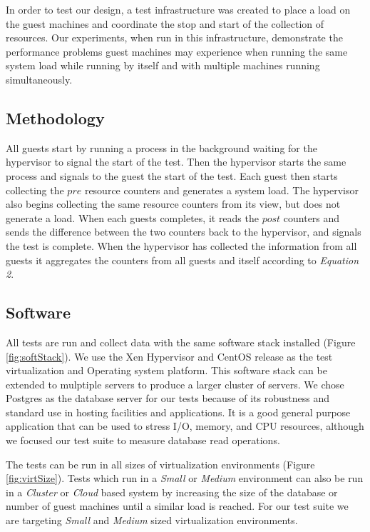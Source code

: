 In order to test our design, a test infrastructure was created to place a load on the guest machines and coordinate the stop and start of the collection of resources.   
Our experiments, when run in this infrastructure, demonstrate the performance problems guest machines may experience when running the same system load while running by itself and with multiple machines running simultaneously.  

\subsection{Methodology}
All guests start by running a process in the background waiting for the hypervisor to signal the start of the test.  
Then the hypervisor starts the same process and signals to the guest the start of the test.  
Each guest then starts collecting the $pre$ resource counters and generates a system load.  
The hypervisor also begins collecting the same resource counters from its view, but does not generate a load.  
When each guests completes, it reads the $post$ counters and sends the difference between the two counters back to the hypervisor, and signals the test is complete.  
When the hypervisor has collected the information from all guests it aggregates the counters from all guests and itself according to \emph{Equation 2}.

\subsection{Software}
\indent All tests are run and collect data with the same software stack installed (Figure \ref{fig:softStack}).  
We use the Xen Hypervisor and CentOS release as the test virtualization and Operating system platform.  
This software stack can be extended to mulptiple servers to produce a larger cluster of servers.  
We chose Postgres as the database server for our tests because of its robustness and standard use in hosting facilities and applications.  
It is a good general purpose application that can be used to stress I/O, memory, and CPU resources, although we focused our test suite to measure database read operations.

\indent The tests can be run in all sizes of virtualization environments (Figure \ref{fig:virtSize}).  
Tests which run in a \emph{Small} or \emph{Medium} environment can also be run in a \emph{Cluster} or \emph{Cloud} based system by increasing the size of the database or number of guest machines until a similar load is reached.  
For our test suite we are targeting \emph{Small} and \emph{Medium} sized virtualization environments. 

